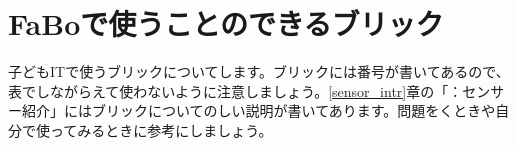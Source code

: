 \documentclass[text05.tex]{subfiles}
\begin{document}
\section{FaBoで使うことのできるブリック}
子どもITで使うブリックについてします。ブリックには番号が書いてあるので、表でしながらえて使わないように注意しましょう。\ref{sensor_intr}章の「：センサー紹介」にはブリックについてのしい説明が書いてあります。問題をくときや自分で使ってみるときに参考にしましょう。\\

\newlength{\colA}
\setlength{\colA}{0.15\columnwidth}
\newlength{\colB}
\setlength{\colB}{0.15\columnwidth}
\newlength{\colC}
\setlength{\colC}{0.3\columnwidth}
\newlength{\colD}
\setlength{\colD}{0.2\columnwidth}
\newlength{\colE}
\setlength{\colE}{0.07\columnwidth}
\end{document}
